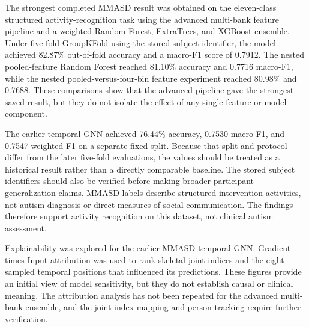 \documentclass[a4paper,12pt]{report}
\begin{document}
The strongest completed MMASD result was obtained on the eleven-class structured activity-recognition task using the advanced multi-bank feature pipeline and a weighted Random Forest, ExtraTrees, and XGBoost ensemble. Under five-fold GroupKFold using the stored subject identifier, the model achieved 82.87\% out-of-fold accuracy and a macro-F1 score of 0.7912. The nested pooled-feature Random Forest reached 81.10\% accuracy and 0.7716 macro-F1, while the nested pooled-versus-four-bin feature experiment reached 80.98\% and 0.7688. These comparisons show that the advanced pipeline gave the strongest saved result, but they do not isolate the effect of any single feature or model component.

The earlier temporal GNN achieved 76.44\% accuracy, 0.7530 macro-F1, and 0.7547 weighted-F1 on a separate fixed split. Because that split and protocol differ from the later five-fold evaluations, the values should be treated as a historical result rather than a directly comparable baseline. The stored subject identifiers should also be verified before making broader participant-generalization claims. MMASD labels describe structured intervention activities, not autism diagnosis or direct measures of social communication. The findings therefore support activity recognition on this dataset, not clinical autism assessment.

Explainability was explored for the earlier MMASD temporal GNN. Gradient-times-Input attribution was used to rank skeletal joint indices and the eight sampled temporal positions that influenced its predictions. These figures provide an initial view of model sensitivity, but they do not establish causal or clinical meaning. The attribution analysis has not been repeated for the advanced multi-bank ensemble, and the joint-index mapping and person tracking require further verification.
\end{document}

